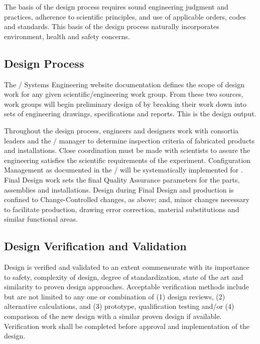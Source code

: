 The basis of the design process requires sound engineering judgment
and practices, adherence to scientific principles, and use of
applicable orders, codes and standards. This basis of the design
process naturally incorporates environment, health and safety
concerns.

\subsection{Design Process}

The / Systems Engineering website
documentation defines the scope of design work for any given
scientific/engineering work group. From these two sources, work groups
will begin preliminary design of  by breaking their work
down into sets of engineering drawings, specifications and
reports. This is the design output.

Throughout the design process, engineers and designers work with
consortia leaders and the /  manager to
determine  inspection criteria of fabricated products and
installations. Close coordination must be made with 
scientists to assure the engineering satisfies the scientific
requirements of the experiment. Configuration Management as documented
in the /  will be
systematically implemented for . Final Design work sets
the final Quality Assurance parameters for the parts, assemblies and
installations. Design during Final Design and production is confined
to Change-Controlled changes, as above; and, minor changes necessary
to facilitate production, drawing error correction, material
substitutions and similar functional areas.

\subsection{Design Verification and Validation}
\label{sec:verification}

Design is verified and validated to an extent commensurate with its
importance to safety, complexity of design, degree of standardization,
state of the art and similarity to proven design
approaches. Acceptable verification methods include but are not
limited to any one or combination of (1) design reviews, (2)
alternative calculations, and (3) prototype, qualification testing
and/or (4) comparison of the new design with a similar proven design
if available. Verification work shall be completed before approval and
implementation of the design.


